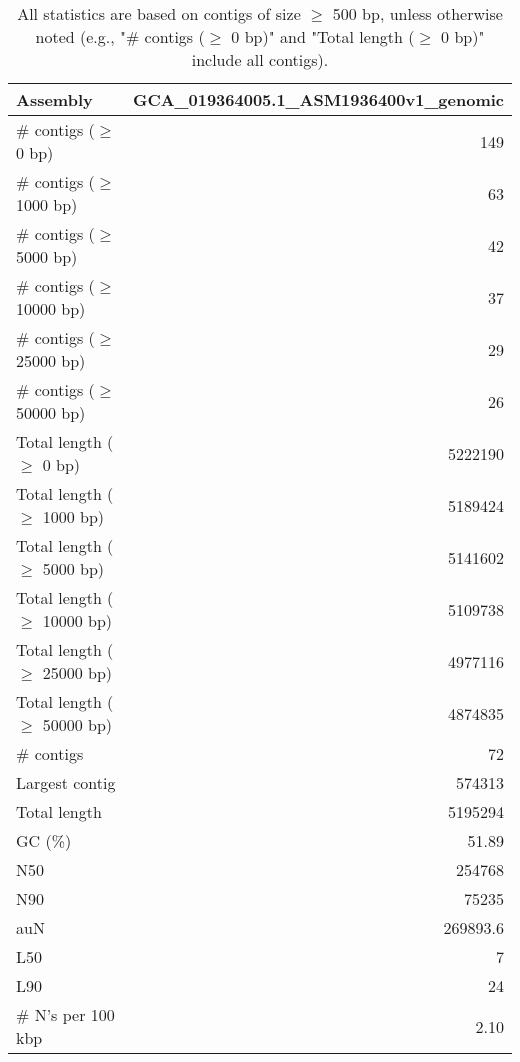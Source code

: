 \documentclass[12pt,a4paper]{article}
\begin{document}
\begin{table}[ht]
\begin{center}
\caption{All statistics are based on contigs of size $\geq$ 500 bp, unless otherwise noted (e.g., "\# contigs ($\geq$ 0 bp)" and "Total length ($\geq$ 0 bp)" include all contigs).}
\begin{tabular}{|l*{1}{|r}|}
\hline
Assembly & GCA\_019364005.1\_ASM1936400v1\_genomic \\ \hline
\# contigs ($\geq$ 0 bp) & 149 \\ \hline
\# contigs ($\geq$ 1000 bp) & 63 \\ \hline
\# contigs ($\geq$ 5000 bp) & 42 \\ \hline
\# contigs ($\geq$ 10000 bp) & 37 \\ \hline
\# contigs ($\geq$ 25000 bp) & 29 \\ \hline
\# contigs ($\geq$ 50000 bp) & 26 \\ \hline
Total length ($\geq$ 0 bp) & 5222190 \\ \hline
Total length ($\geq$ 1000 bp) & 5189424 \\ \hline
Total length ($\geq$ 5000 bp) & 5141602 \\ \hline
Total length ($\geq$ 10000 bp) & 5109738 \\ \hline
Total length ($\geq$ 25000 bp) & 4977116 \\ \hline
Total length ($\geq$ 50000 bp) & 4874835 \\ \hline
\# contigs & 72 \\ \hline
Largest contig & 574313 \\ \hline
Total length & 5195294 \\ \hline
GC (\%) & 51.89 \\ \hline
N50 & 254768 \\ \hline
N90 & 75235 \\ \hline
auN & 269893.6 \\ \hline
L50 & 7 \\ \hline
L90 & 24 \\ \hline
\# N's per 100 kbp & 2.10 \\ \hline
\end{tabular}
\end{center}
\end{table}
\end{document}
